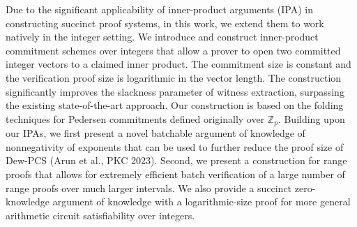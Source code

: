 \documentclass[11pt]{article}
\theoremstyle{definition}
\theoremstyle{remark}
\theoremstyle{plain}
\begin{document}
Due to the significant applicability of inner-product arguments (IPA) in constructing succinct proof systems, in this work, we extend them to work natively in the integer setting. We introduce and construct inner-product commitment schemes over integers that allow a prover to open two committed integer vectors to a claimed inner product. The commitment size is constant and the verification proof size is logarithmic in the vector length. The construction significantly improves the slackness parameter of witness extraction, surpassing the existing state-of-the-art approach. Our construction is based on the folding techniques for Pedersen commitments defined originally over $\mathbb{Z}_p$.
Building upon our IPAs, we first present a novel batchable argument of knowledge of nonnegativity of exponents that can be used to further reduce the proof size of Dew-PCS (Arun et al., PKC 2023). Second, we present a construction for range proofs that allows for extremely efficient batch verification of a large number of range proofs over much larger intervals. We also provide a succinct zero-knowledge argument of knowledge with a logarithmic-size proof for more general arithmetic circuit satisfiability over integers.

\printbibliography
\end{document}

